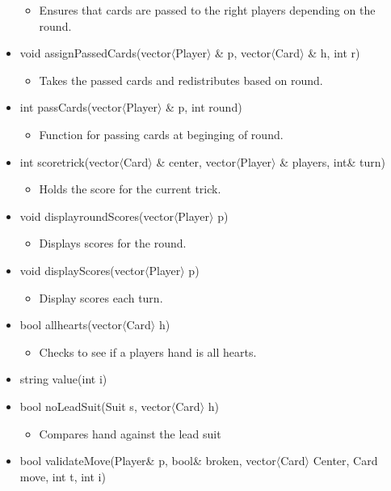 \documentclass[]{scrartcl}
\begin{document}
\begin{itemize}
 		\begin{itemize}
 			\item Ensures that cards are passed to the right players depending on the round.
 		\end{itemize}
 	\item void assignPassedCards(vector$\langle$Player$\rangle$ \& p, vector$\langle$Card$\rangle$ \& h, int r)
 		\begin{itemize}
 			\item Takes the passed cards and redistributes based on round.
 		\end{itemize}
 	\item int passCards(vector$\langle$Player$\rangle$ \& p, int round)
 		\begin{itemize}
 			\item Function for passing cards at beginging of round.
 		\end{itemize}
 	\item int scoretrick(vector$\langle$Card$\rangle$ \& center, vector$\langle$Player$\rangle$ \& players, int\& turn)
 		\begin{itemize}
 			\item 	Holds the score for the current trick.
 		\end{itemize}
 	\item void displayroundScores(vector$\langle$Player$\rangle$ p)
 		\begin{itemize}
 			\item Displays scores for the round.
 		\end{itemize}
 	\item void displayScores(vector$\langle$Player$\rangle$  p)
 		\begin{itemize}
 			\item Display scores each turn.
 		\end{itemize}
 	\item bool allhearts(vector$\langle$Card$\rangle$ h)
 		\begin{itemize}
 			\item Checks to see if a players hand is all hearts.
 		\end{itemize}
 	\item string value(int i)
 	\item bool noLeadSuit(Suit s, vector$\langle$Card$\rangle$ h)
 		\begin{itemize}
 			\item Compares hand against the lead suit
 		\end{itemize}
 	\item bool validateMove(Player\& p, bool\& broken, vector$\langle$Card$\rangle$  Center, Card move, int t, int i)

\end{itemize}
\end{document}
